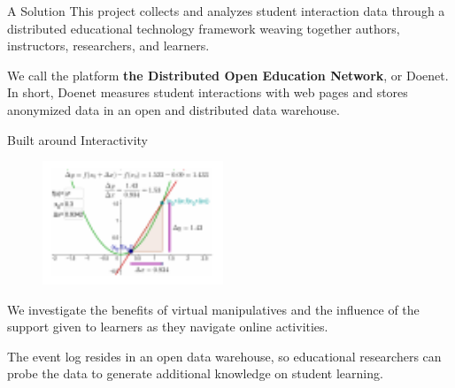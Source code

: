 \begin{sectionblock}{A Solution}
  This project collects and analyzes student interaction data through
  a distributed educational technology framework weaving together
  authors, instructors, researchers, and learners.

  \vspace{1ex}We call the platform \textbf{the Distributed Open
    Education Network}, or Doenet.  In short, Doenet measures student
  interactions with web pages and stores anonymized data in an open
  and distributed data warehouse.
\end{sectionblock}

\vspace{1ex}

\begin{sectionblock}{Built around Interactivity}

  \begin{figure}
    \includegraphics[width=0.48\textwidth]{math-insight.pdf}
  \end{figure}
  We investigate the benefits of virtual manipulatives and the
  influence of the support given to learners as they navigate online
  activities.

  \vspace{1ex}The event log resides in an open data warehouse, so 
  educational researchers can probe the data to generate additional
  knowledge on student learning.
\end{sectionblock}

    
